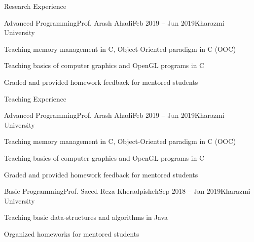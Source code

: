 \documentclass[]{main}
\begin{document}

\begin{section}{Research Experience}
 \begin{subsection}{Advanced Programming}{Prof. Arash Ahadi}{Feb 2019 -- Jun 2019}{Kharazmi University}
     \item Teaching memory management in C, Object-Oriented paradigm in C (OOC) \;\href{https://github.com/ckoliber/ooc_lecture}{\faExternalLink*}
     \item Teaching basics of computer graphics and OpenGL programs in C \;\href{https://github.com/ckoliber/opengl}{\faExternalLink*}
     \item Graded and provided homework feedback for mentored students
 \end{subsection}
\end{section}

\begin{section}{Teaching Experience}
 \begin{subsection}{Advanced Programming}{Prof. Arash Ahadi}{Feb 2019 -- Jun 2019}{Kharazmi University}
     \item Teaching memory management in C, Object-Oriented paradigm in C (OOC) \;\href{https://github.com/ckoliber/ooc_lecture}{\faExternalLink*}
     \item Teaching basics of computer graphics and OpenGL programs in C \;\href{https://github.com/ckoliber/opengl}{\faExternalLink*}
     \item Graded and provided homework feedback for mentored students
 \end{subsection}

 \begin{subsection}{Basic Programming}{Prof. Saeed Reza Kheradpisheh}{Sep 2018 -- Jan 2019}{Kharazmi University}
     \item Teaching basic data-structures and algorithms in Java
     \item Organized homeworks for mentored students \;\href{https://github.com/ckoliber/Phy97Sources}{\faExternalLink*}
 \end{subsection}
\end{section}
\end{document}
